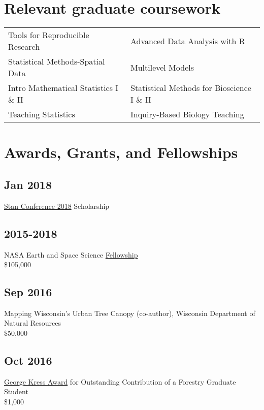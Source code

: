 \documentclass{article}
\begin{document}
\section*{Relevant graduate coursework}
\label{sec:org483b7ae}
\begin{center}
\begin{tabular}{ll}
Tools for Reproducible Research & Advanced Data Analysis with R\\
Statistical Methods-Spatial Data & Multilevel Models\\
Intro Mathematical Statistics I \& II & Statistical Methods for Bioscience I \& II\\
Teaching Statistics & Inquiry-Based Biology Teaching\\
\end{tabular}
\end{center}

\section*{Awards, Grants, and Fellowships}
\label{sec:org2e4243e}
\subsection*{Jan 2018}
\label{sec:org511ecc6}
\href{http://mc-stan.org/events/}{Stan Conference 2018} Scholarship

\subsection*{2015-2018}
\label{sec:org3a49c2d}
NASA Earth and Space Science \href{https://nspires.nasaprs.com/external/viewrepositorydocument/cmdocumentid=459947/solicitationId=\%7BB6CDCEA6-8EDD-A48A-FAF8-E588F66661C3\%7D/viewSolicitationDocument=1/NESSF15\%20selections.pdf}{Fellowship}\\
\$105,000

\subsection*{Sep 2016}
\label{sec:org5e3c000}
Mapping Wisconsin's Urban Tree Canopy (co-author), Wisconsin
Department of Natural Resources\\
\$50,000

\subsection*{Oct 2016}
\label{sec:org22d547f}
\href{https://kb.wisc.edu/russell/page.php?id=65402}{George Kress Award} for Outstanding Contribution of a Forestry Graduate
Student \\
\$1,000
\end{document}
